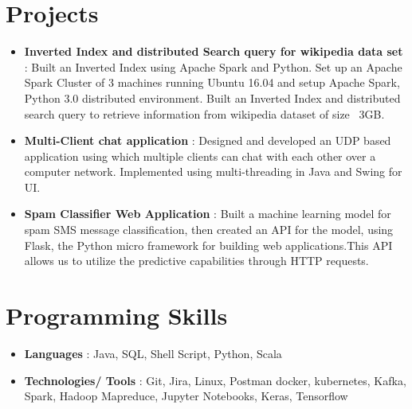 \documentclass[letterpaper,11pt]{article}
\newcommand{\resumeItem}[2]{
  \item\small{
    \textbf{#1}{: #2 \vspace{-2pt}}
  }
}
\newcommand{\resumeSubItem}[2]{\resumeItem{#1}{#2}\vspace{-4pt}}
\newcommand{\resumeSubHeadingListStart}{\begin{itemize}[leftmargin=*]}
\newcommand{\resumeSubHeadingListEnd}{\end{itemize}}
\begin{document}
\section{Projects}
  \resumeSubHeadingListStart
    \resumeSubItem{Inverted Index and distributed Search query for wikipedia data set }
      {Built an Inverted Index using Apache Spark and Python.
Set up an Apache Spark Cluster of 3 machines running Ubuntu 16.04 and setup Apache Spark, Python 3.0 distributed environment.
Built an Inverted Index and distributed search query to retrieve information from wikipedia dataset of size ~3GB.}
\resumeSubItem{Multi-Client chat application }
      {Designed and developed an UDP based application using which multiple clients can chat with each other over a computer network. Implemented using multi-threading in Java and Swing for UI.}

    \resumeSubItem{Spam Classifier Web Application }
      {Built a machine learning model for spam SMS message classification, then created an API for the model, using Flask, the Python micro framework for building web applications.This API allows us to utilize the predictive capabilities through HTTP requests.}

  \resumeSubHeadingListEnd


\section{Programming Skills}
  \resumeSubHeadingListStart
    \resumeSubItem{Languages }{Java, SQL, Shell Script, Python, Scala}
    \resumeSubItem{Technologies/ Tools }{Git, Jira, Linux, Postman docker, kubernetes, Kafka, Spark, Hadoop Mapreduce, Jupyter Notebooks, Keras, Tensorflow}
  \resumeSubHeadingListEnd


\end{document}
